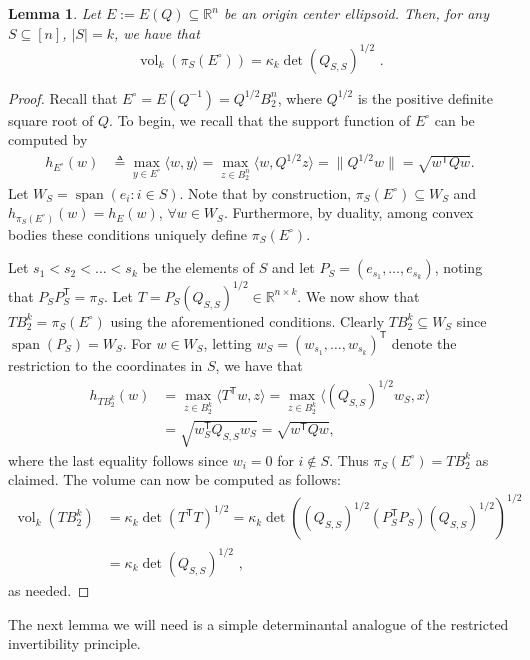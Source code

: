 \documentclass[12pt]{article}
\newtheorem{lemma}{Lemma}
\newcommand{\R}{{\mathbb{R}}}
\newcommand{\T}{\mathsf T}
\newcommand{\eqdef}{\triangleq}
\newcommand{\inner}[2]{\langle #1, #2 \rangle}
\DeclareMathOperator{\vol}{vol}
\DeclareMathOperator{\lspan}{span}
\begin{document}
\begin{lemma}\label{lem:ellipsoid-volumes}
Let $E := E(Q) \subseteq \R^n$ be an origin center ellipsoid. Then, for any
$S \subseteq [n]$, $|S| = k$, we have that 
\[
\vol_k(\pi_S(E^\circ)) = \kappa_k \det(Q_{S,S})^{1/2} \text{ .}
\]
\end{lemma}
\begin{proof}
Recall that $E^\circ = E(Q^{-1}) = Q^{1/2} B_2^n$, where $Q^{1/2}$ is the
positive definite square root of $Q$. To begin, we recall that the support
function of $E^\circ$ can be computed by
\begin{align*}
h_{E^\circ}(w) &\eqdef \max_{y \in E^\circ} \inner{w}{y} 
               = \max_{z \in B_2^n} \inner{w}{Q^{1/2} z} 
               = \|Q^{1/2} w\| = \sqrt{w^\T Q w}.
\end{align*}
Let $W_S = \lspan(e_i: i \in S)$. Note that by construction, $\pi_S(E^\circ)
\subseteq W_S$ and $h_{\pi_S(E^\circ)}(w) = h_{E}(w)$, $\forall w \in W_S$.
Furthermore, by duality, among convex bodies these conditions uniquely define $\pi_S(E^\circ)$. 

Let $s_1 < s_2 < \dots < s_k$ be the elements of $S$ and let $P_S =
(e_{s_1},\dots,e_{s_k})$, noting that $P_S P_S^\T = \pi_S$. Let $T = P_S
(Q_{S,S})^{1/2} \in \R^{n \times k}$. We now show that $TB_2^k = \pi_S(E^\circ)$
using the aforementioned conditions. Clearly $TB_2^k \subseteq W_S$ since
$\lspan(P_S) = W_S$. For $w \in W_S$, letting $w_S = (w_{s_1},\dots,w_{s_k})^\T$
denote the restriction to the coordinates in $S$, we have that 
\begin{align*}
h_{TB_2^k}(w) &= \max_{z \in B_2^k} \inner{T^\T w}{z} 
              = \max_{z \in B_2^k} \inner{(Q_{S,S})^{1/2} w_S}{x} \\ 
              &= \sqrt{w_S^\T Q_{S,S} w_S} = \sqrt{w^\T Q w} ,
\end{align*} 
where the last equality follows since $w_i = 0$ for $i \notin S$. Thus
$\pi_S(E^\circ) = TB_2^k$ as claimed. The volume can now be computed as follows:
\begin{align*}
\vol_k(TB_2^k) &= \kappa_k \det(T^\T T)^{1/2} 
               = \kappa_k \det((Q_{S,S})^{1/2} (P_S^\T P_S)
(Q_{S,S})^{1/2})^{1/2} \\
               &= \kappa_k \det(Q_{S,S})^{1/2} \text{ ,}
\end{align*}
as needed.
\end{proof}

The next lemma we will need is a simple determinantal analogue of the restricted
invertibility principle.
\end{document}
